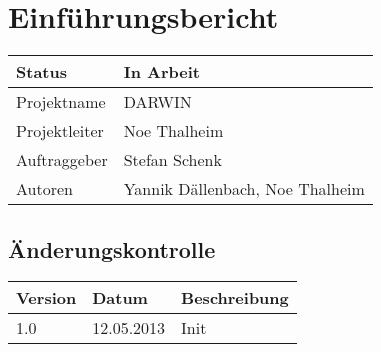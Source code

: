 \documentclass{scrartcl}
\begin{document}
	\section*{Einführungsbericht}
	
	\begin{tabularx}{\textwidth}{| X | X |}
	\hline
	Status & In Arbeit\\
	\hline
	Projektname & DARWIN\\
	\hline
	Projektleiter & Noe Thalheim\\
	\hline
	Auftraggeber & Stefan Schenk\\
	\hline
	Autoren & Yannik Dällenbach, Noe Thalheim\\
	\hline
	\end{tabularx}
	
	\subsection*{Änderungskontrolle}
	\begin{tabularx}{\textwidth}{| X | X | X |}
	\hline
	\rowcolor[gray]{0.9} Version & Datum & Beschreibung\\
	\hline
	1.0 & 12.05.2013 & Init\\
	\hline
	\end{tabularx}
	
	\pagebreak
	\tableofcontents
	\pagebreak
\end{document}
